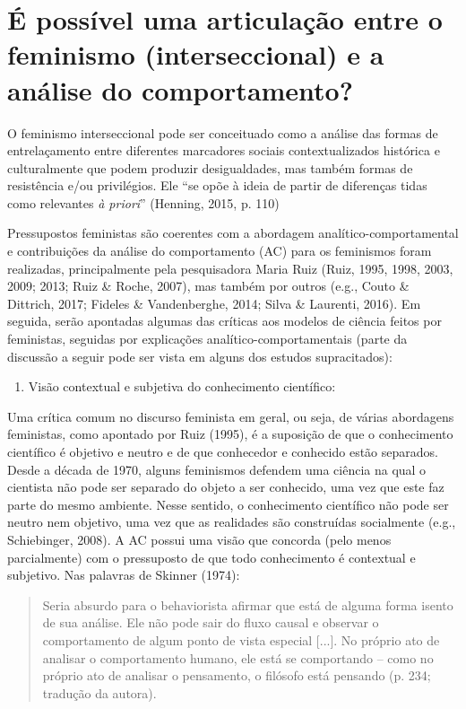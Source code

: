 \section*{É possível uma articulação entre o feminismo (interseccional) e a análise do comportamento?}

O feminismo interseccional pode ser conceituado como a análise das formas de entrelaçamento entre diferentes marcadores sociais contextualizados histórica e culturalmente que podem produzir desigualdades, mas também formas de resistência e/ou privilégios. Ele ``se opõe à ideia de partir de diferenças tidas como relevantes \textit{à priori}'' (Henning, 2015, p. 110)

Pressupostos feministas são coerentes com a abordagem analítico-comportamental e contribuições da análise do comportamento (AC) para os feminismos foram realizadas, principalmente pela pesquisadora Maria Ruiz (Ruiz, 1995, 1998, 2003, 2009; 2013; Ruiz \& Roche, 2007), mas também por outros (e.g., Couto \& Dittrich, 2017; Fideles \& Vandenberghe, 2014; Silva \& Laurenti, 2016). Em seguida, serão apontadas algumas das críticas aos modelos de ciência feitos por feministas, seguidas por explicações analítico-comportamentais (parte da discussão a seguir pode ser vista em alguns dos estudos supracitados): 


\begin{enumerate}
    \item Visão contextual e subjetiva do conhecimento científico: 
\end{enumerate}   
Uma crítica comum no discurso feminista em geral, ou seja, de várias abordagens feministas, como apontado por Ruiz (1995), é a suposição de que o conhecimento científico é objetivo e neutro e de que conhecedor e conhecido estão separados. Desde a década de 1970, alguns feminismos defendem uma ciência na qual o cientista não pode ser separado do objeto a ser conhecido, uma vez que este faz parte do mesmo ambiente. Nesse sentido, o conhecimento científico não pode ser neutro nem objetivo, uma vez que as realidades são construídas socialmente (e.g., Schiebinger, 2008). A AC possui uma visão que concorda (pelo menos parcialmente) com o pressuposto de que todo conhecimento é contextual e subjetivo. Nas palavras de Skinner (1974):

\begin{quote}
    Seria absurdo para o behaviorista afirmar que está de alguma forma isento de sua análise. Ele não pode sair do fluxo causal e observar o comportamento de algum ponto de vista especial [...]. No próprio ato de analisar o comportamento humano, ele está se comportando – como no próprio ato de analisar o pensamento, o filósofo está pensando (p. 234; tradução da autora).
\end{quote}

